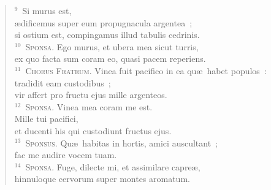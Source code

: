 \begin{verse}
${}^{9}$~Si murus est,\\ \ae dificemus super eum propugnacula argentea~;\\ si ostium est, compingamus illud tabulis cedrinis.\\
${}^{10}$~\textsc{Sponsa.} Ego murus, et ubera mea sicut turris,\\ ex quo facta sum coram eo, quasi pacem reperiens.\\
${}^{11}$~\textsc{Chorus Fratrum.} Vinea fuit pacifico in ea qu\ae\ habet populos~:\\ tradidit eam custodibus~;\\ vir affert pro fructu ejus mille argenteos.\\
${}^{12}$~\textsc{Sponsa.} Vinea mea coram me est.\\ Mille tui pacifici,\\ et ducenti his qui custodiunt fructus ejus.\\
${}^{13}$~\textsc{Sponsus.} Qu\ae\ habitas in hortis, amici auscultant~;\\ fac me audire vocem tuam.\\
${}^{14}$~\textsc{Sponsa.} Fuge, dilecte mi, et assimilare capre\ae ,\\ hinnuloque cervorum super montes aromatum.\end{verse}


